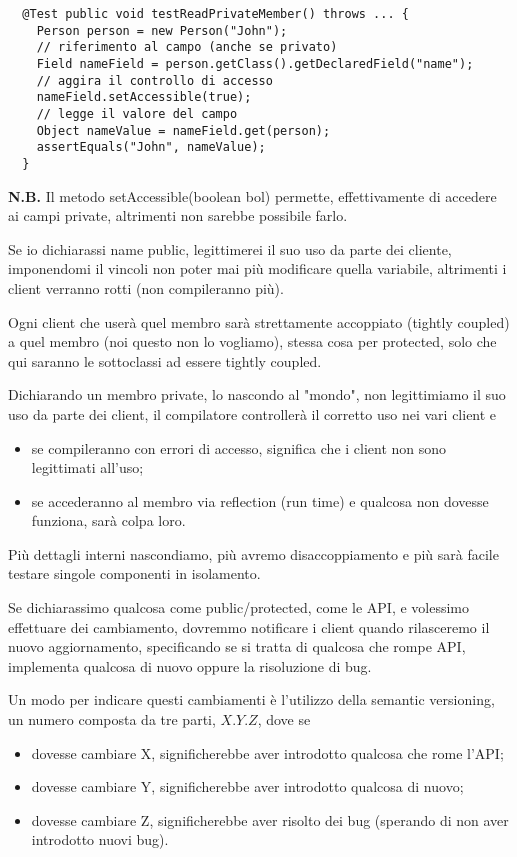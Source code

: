 \begin{lstlisting}
  @Test public void testReadPrivateMember() throws ... {
    Person person = new Person("John");
    // riferimento al campo (anche se privato)
    Field nameField = person.getClass().getDeclaredField("name");
    // aggira il controllo di accesso
    nameField.setAccessible(true);
    // legge il valore del campo
    Object nameValue = nameField.get(person);
    assertEquals("John", nameValue);
  }
\end{lstlisting}

\textbf{N.B.} Il metodo setAccessible(boolean bol) permette, effettivamente di accedere ai campi private, altrimenti non sarebbe possibile farlo.
\medskip

Se io dichiarassi name public, legittimerei il suo uso da parte dei cliente, imponendomi il vincoli non poter mai più modificare quella variabile, altrimenti i client 
verranno rotti (non compileranno più).

Ogni client che userà quel membro sarà strettamente accoppiato (tightly coupled) a quel membro (noi questo non lo vogliamo), stessa cosa per protected, solo che qui 
saranno le sottoclassi ad essere tightly coupled.

Dichiarando un membro private, lo nascondo al "mondo", non legittimiamo il suo uso da parte dei client, il compilatore controllerà il corretto uso nei vari client e
\begin{itemize}
  \item se compileranno con errori di accesso, significa che i client non sono legittimati all’uso;
  \item se accederanno al membro via reflection (run time) e qualcosa non dovesse funziona, sarà colpa loro. 
\end{itemize} 

Più dettagli interni nascondiamo, più avremo disaccoppiamento e più sarà facile testare singole componenti in isolamento.

Se dichiarassimo qualcosa come public/protected, come le API, e volessimo effettuare dei cambiamento, dovremmo notificare i client quando rilasceremo il nuovo 
aggiornamento, specificando se si tratta di qualcosa che rompe API, implementa qualcosa di nuovo oppure la risoluzione di bug.

Un modo per indicare questi cambiamenti è l'utilizzo della semantic versioning, un numero composta da tre parti, $X.Y.Z$, dove se
\begin{itemize}
  \item dovesse cambiare X, significherebbe aver introdotto qualcosa che rome l'API;
  \item dovesse cambiare Y, significherebbe aver introdotto qualcosa di nuovo;
  \item dovesse cambiare Z, significherebbe aver risolto dei bug (sperando di non aver introdotto nuovi bug).
\end{itemize}